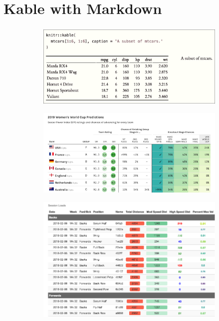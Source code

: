 \documentclass[xcolor=dvipsnames]{beamer}
\begin{document}
\section{Kable with Markdown}
\begin{frame}
\frametitle{\insertsectionhead}
\begin{figure}
	\centering
	\begin{subfigure}[t!]{0.49\textwidth}
	\centering
		\includegraphics[width=1\linewidth]{images/kable_ex.png}
	\end{subfigure}%
	\hfill
	\begin{subfigure}[t!]{0.49\textwidth}
	\centering
		\includegraphics[width=1\linewidth]{images/table_nice.png}
	\end{subfigure}%
	\hfill
	\begin{subfigure}[t!]{0.49\textwidth}
	\centering
		\includegraphics[width=1\linewidth]{images/table_nice_2.png}
	\end{subfigure}
\end{figure}
\end{frame}
\end{document}
